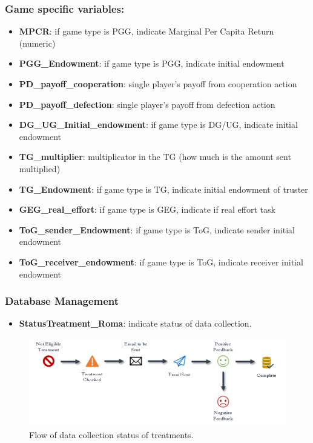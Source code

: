 \documentclass[
]{article}
\providecommand{\tightlist}{%
  \setlength{\itemsep}{0pt}\setlength{\parskip}{0pt}}
\begin{document}
\hypertarget{game-specific-variables}{%
\subsubsection{Game specific variables:}\label{game-specific-variables}}

\begin{itemize}
\tightlist
\item
  \textbf{MPCR}: if game type is PGG, indicate Marginal Per Capita
  Return (numeric)
\item
  \textbf{PGG\_Endowment}: if game type is PGG, indicate initial
  endowment
\item
  \textbf{PD\_payoff\_cooperation}: single player's payoff from
  cooperation action
\item
  \textbf{PD\_payoff\_defection}: single player's payoff from defection
  action
\item
  \textbf{DG\_UG\_Initial\_endowment}: if game type is DG/UG, indicate
  initial endowment
\item
  \textbf{TG\_multiplier}: multiplicator in the TG (how much is the
  amount sent multiplied)
\item
  \textbf{TG\_Endowment}: if game type is TG, indicate initial endowment
  of truster
\item
  \textbf{GEG\_real\_effort}: if game type is GEG, indicate if real
  effort task
\item
  \textbf{ToG\_sender\_Endowment}: if game type is ToG, indicate sender
  initial endowment
\item
  \textbf{ToG\_receiver\_endowment}: if game type is ToG, indicate
  receiver initial endowment
\end{itemize}

\hypertarget{database-management}{%
\subsubsection{Database Management}\label{database-management}}

\begin{itemize}
\tightlist
\item
  \textbf{StatusTreatment\_Roma}: indicate status of data collection.
\end{itemize}

\begin{figure}

{\centering \includegraphics[width=1\linewidth]{Attachments/StatusTreatment} 

}

\caption{Flow of data collection status of treatments.}\label{fig:unnamed-chunk-1}
\end{figure}
\end{document}
